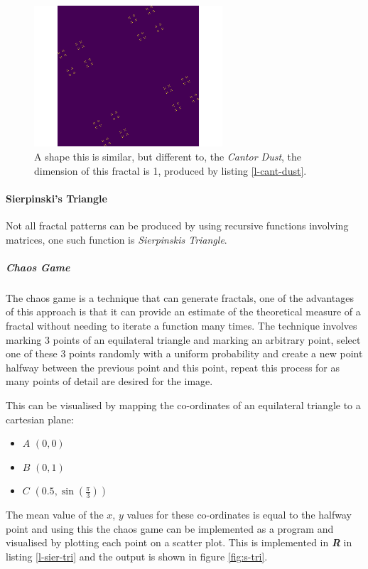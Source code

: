 \documentclass[a4paper,11pt,twoside]{article}
\begin{document}
\begin{figure}[htbp]
\centering
\includegraphics[width=7cm]{media/Cantor_Dust_gen.png}
\caption{\label{fig:cantor-dust}A shape this is similar, but different to, the \emph{Cantor Dust}, the dimension of this fractal is 1, produced by listing \ref{l-cant-dust}.}
\end{figure}



\paragraph{Sierpinski's Triangle}
\label{sec:org5f574e8}
Not all fractal patterns can be produced by using recursive functions involving matrices, one such function is \emph{Sierpinskis Triangle}.
\subparagraph{Chaos Game}
\label{sec:org93f67e3}
The chaos game is a technique that can generate fractals, one of the advantages of this approach is that it can provide an estimate of the theoretical measure of a fractal without needing to iterate a function many times. The technique involves marking 3 points of an equilateral triangle and marking an arbitrary point, select one of these 3 points randomly with a uniform probability and create a new point halfway between the previous point and this point, repeat this process for as many points of detail are desired for the image.

This can be visualised by mapping the co-ordinates of an equilateral triangle to a cartesian plane:

\begin{itemize}
\item \(A\)  \(\left(0, 0\right)\)
\item \(B\)  \(\left(0, 1\right)\)
\item \(C\)  \(\left(0.5, \sin\left(\frac{\pi}{3}\right)\right)\)
\end{itemize}

The mean value of the \(x\), \(y\) values for these co-ordinates is equal to the
halfway point and using this the chaos game can be implemented as a program and
visualised by plotting each point on a scatter plot. This is implemented in
\emph{\textbf{R}} in listing \ref{l-sier-tri} and the output is shown in figure \ref{fig:s-tri}.
\end{document}
